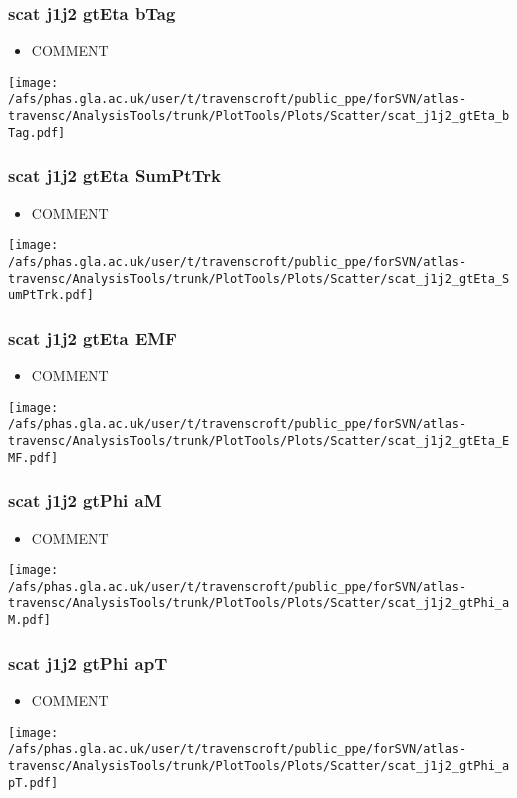 \documentclass{beamer}
\begin{document}
\begin{frame}
\frametitle{scat j1j2 gtEta bTag}
\begin{itemize}
\item COMMENT
\end{itemize}
\begin{center}
\texttt{[image: /afs/phas.gla.ac.uk/user/t/travenscroft/public\_ppe/forSVN/atlas-travensc/AnalysisTools/trunk/PlotTools/Plots/Scatter/scat\_j1j2\_gtEta\_bTag.pdf]}
\end{center}
\end{frame}

\begin{frame}
\frametitle{scat j1j2 gtEta SumPtTrk}
\begin{itemize}
\item COMMENT
\end{itemize}
\begin{center}
\texttt{[image: /afs/phas.gla.ac.uk/user/t/travenscroft/public\_ppe/forSVN/atlas-travensc/AnalysisTools/trunk/PlotTools/Plots/Scatter/scat\_j1j2\_gtEta\_SumPtTrk.pdf]}
\end{center}
\end{frame}

\begin{frame}
\frametitle{scat j1j2 gtEta EMF}
\begin{itemize}
\item COMMENT
\end{itemize}
\begin{center}
\texttt{[image: /afs/phas.gla.ac.uk/user/t/travenscroft/public\_ppe/forSVN/atlas-travensc/AnalysisTools/trunk/PlotTools/Plots/Scatter/scat\_j1j2\_gtEta\_EMF.pdf]}
\end{center}
\end{frame}

\begin{frame}
\frametitle{scat j1j2 gtPhi aM}
\begin{itemize}
\item COMMENT
\end{itemize}
\begin{center}
\texttt{[image: /afs/phas.gla.ac.uk/user/t/travenscroft/public\_ppe/forSVN/atlas-travensc/AnalysisTools/trunk/PlotTools/Plots/Scatter/scat\_j1j2\_gtPhi\_aM.pdf]}
\end{center}
\end{frame}

\begin{frame}
\frametitle{scat j1j2 gtPhi apT}
\begin{itemize}
\item COMMENT
\end{itemize}
\begin{center}
\texttt{[image: /afs/phas.gla.ac.uk/user/t/travenscroft/public\_ppe/forSVN/atlas-travensc/AnalysisTools/trunk/PlotTools/Plots/Scatter/scat\_j1j2\_gtPhi\_apT.pdf]}
\end{center}
\end{frame}
\end{document}

